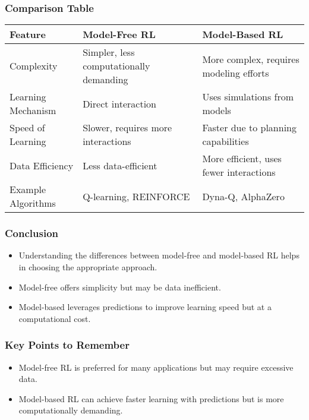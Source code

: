 \documentclass[aspectratio=169]{beamer}
\begin{document}
\begin{frame}[fragile]
    \frametitle{Comparison Table}
    \centering
    \begin{tabular}{|l|l|l|}
        \hline
        \textbf{Feature} & \textbf{Model-Free RL} & \textbf{Model-Based RL} \\
        \hline
        Complexity & Simpler, less computationally demanding & More complex, requires modeling efforts \\
        \hline
        Learning Mechanism & Direct interaction & Uses simulations from models \\
        \hline
        Speed of Learning & Slower, requires more interactions & Faster due to planning capabilities \\
        \hline
        Data Efficiency & Less data-efficient & More efficient, uses fewer interactions \\
        \hline
        Example Algorithms & Q-learning, REINFORCE & Dyna-Q, AlphaZero \\
        \hline
    \end{tabular}
\end{frame}

\begin{frame}[fragile]
    \frametitle{Conclusion}
    \begin{itemize}
        \item Understanding the differences between model-free and model-based RL helps in choosing the appropriate approach.
        \item Model-free offers simplicity but may be data inefficient.
        \item Model-based leverages predictions to improve learning speed but at a computational cost.
    \end{itemize}
\end{frame}

\begin{frame}[fragile]
    \frametitle{Key Points to Remember}
    \begin{itemize}
        \item Model-free RL is preferred for many applications but may require excessive data.
        \item Model-based RL can achieve faster learning with predictions but is more computationally demanding.
    \end{itemize}
\end{frame}
\end{document}
